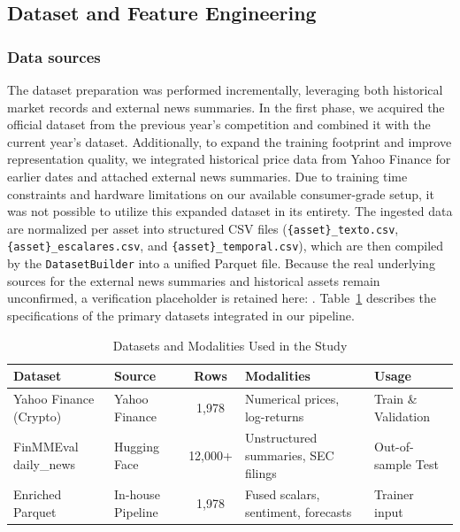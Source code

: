     \subsection{Dataset and Feature Engineering}
    \label{sec:dataset}

    \subsubsection{Data sources}
    \label{sec:datasources}

    The dataset preparation was performed incrementally, leveraging both historical market records and external news summaries. In the first phase, we acquired the official dataset from the previous year's competition and combined it with the current year's dataset. Additionally, to expand the training footprint and improve representation quality, we integrated historical price data from Yahoo Finance for earlier dates and attached external news summaries. Due to training time constraints and hardware limitations on our available consumer-grade setup, it was not possible to utilize this expanded dataset in its entirety. The ingested data are normalized per asset into structured CSV files (\texttt{\{asset\}\_texto.csv}, \texttt{\{asset\}\_escalares.csv}, and \texttt{\{asset\}\_temporal.csv}), which are then compiled by the \texttt{DatasetBuilder} into a unified Parquet file. Because the real underlying sources for the external news summaries and historical assets remain unconfirmed, a verification placeholder is retained here: . Table~\ref{tab:datasets_used} describes the specifications of the primary datasets integrated in our pipeline.


    \begin{table}[htbp]
    \centering
    \small
    \caption{Datasets and Modalities Used in the Study}
    \label{tab:datasets_used}
    \begin{tabular}{lp{2cm}cp{3.5cm}p{2.6cm}}
    \hline
    \textbf{Dataset} & \textbf{Source} & \textbf{Rows} & \textbf{Modalities} & \textbf{Usage} \\
    \hline
    Yahoo Finance (Crypto) & Yahoo Finance & 1,978 & Numerical prices, log-returns & Train \& Validation \\
    FinMMEval daily\_news & Hugging Face & 12,000+ & Unstructured summaries, SEC filings & Out-of-sample Test \\
    Enriched Parquet & In-house Pipeline & 1,978 & Fused scalars, sentiment, forecasts & Trainer input \\
    \hline
    \end{tabular}
    \end{table}



